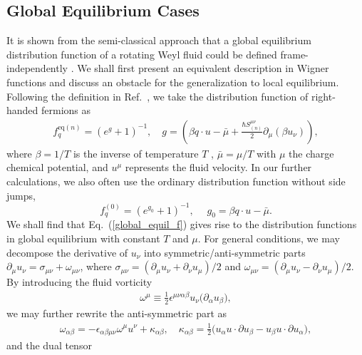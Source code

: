 \documentclass[aps,prd,showkeys,preprint,amsmath,amssymb,nofootinbib]{revtex4-1}
\begin{document}
\subsection{Global Equilibrium Cases} \label{global}
It is shown from the semi-classical approach that a global equilibrium distribution function of a rotating Weyl fluid could be defined frame-independently \cite{Chen:2015gta}. We shall first present an equivalent description in Wigner functions and discuss an obstacle for the generalization to local equilibrium.   
Following the definition in Ref.~\cite{Chen:2015gta}, we take the distribution function of right-handed fermions as
\begin{eqnarray}\label{global_equil_f}
	f^{\text{eq}(n)}_q=(e^{g}+1)^{-1},\quad g=\left(\beta q\cdot u- \bar{\mu}+\frac{\hbar S^{\mu\nu}_{(n)}}{2}\partial_{\mu}(\beta u_{\nu})\right),
\end{eqnarray} 
where $\beta=1/T$ is the inverse of temperature $T$ , $\bar{\mu}=\mu/T$ with $\mu$ the charge chemical potential, and $u^{\mu}$ represents the fluid velocity. 
In our further calculations, we also often use the ordinary distribution function without side jumps,
\begin{equation}
f^{(0)}_q=(e^{g_0}+1)^{-1},\;\quad g_0=\beta q\cdot u-\bar{\mu}.
\end{equation}
We shall find that Eq.~(\ref{global_equil_f}) gives rise to the distribution functions in global equilibrium with constant $T$ and $\mu$. For general conditions, we may decompose the derivative of $u_{\nu}$ into symmetric/anti-symmetric parts $\partial_{\mu}u_{\nu}=\sigma_{\mu\nu}+\omega_{\mu\nu}$, where $\sigma_{\mu\nu}=(\partial_{\mu}u_{\nu}+\partial_{\nu}u_{\mu})/2$ and $\omega_{\mu\nu}=(\partial_{\mu}u_{\nu}-\partial_{\nu}u_{\mu})/2$. By introducing the fluid vorticity
\begin{eqnarray}
\omega^{\mu}\equiv\frac{1}{2}\epsilon^{\mu\nu\alpha\beta}u_{\nu}\big(\partial_{\alpha}u_{\beta}\big),
\end{eqnarray}
we may further rewrite the anti-symmetric part as
\begin{eqnarray}
\omega_{\alpha\beta}=-\epsilon_{\alpha\beta\mu\nu}\omega^{\mu}u^{\nu}+\kappa_{\alpha\beta},
\quad
\kappa_{\alpha\beta}=\frac{1}{2}\big(u_{\alpha}u\cdot\partial u_{\beta}-u_{\beta}u\cdot\partial u_{\alpha}\big),
\end{eqnarray}
and the dual tensor
\end{document}
